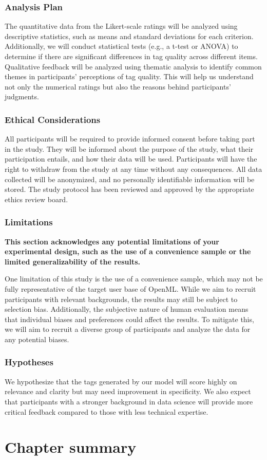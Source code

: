\subsubsection{Analysis Plan}
The quantitative data from the Likert-scale ratings will be analyzed using descriptive statistics, such as means and standard deviations for each criterion. Additionally, we will conduct statistical tests (e.g., a t-test or ANOVA) to determine if there are significant differences in tag quality across different items. Qualitative feedback will be analyzed using thematic analysis to identify common themes in participants' perceptions of tag quality. This will help us understand not only the numerical ratings but also the reasons behind participants' judgments.

\subsubsection{Ethical Considerations}
All participants will be required to provide informed consent before taking part in the study. They will be informed about the purpose of the study, what their participation entails, and how their data will be used. Participants will have the right to withdraw from the study at any time without any consequences. All data collected will be anonymized, and no personally identifiable information will be stored. The study protocol has been reviewed and approved by the appropriate ethics review board.

\subsubsection{Limitations}
\textbf{This section acknowledges any potential limitations of your experimental design, such as the use of a convenience sample or the limited generalizability of the results.}

One limitation of this study is the use of a convenience sample, which may not be fully representative of the target user base of OpenML. While we aim to recruit participants with relevant backgrounds, the results may still be subject to selection bias. Additionally, the subjective nature of human evaluation means that individual biases and preferences could affect the results. To mitigate this, we will aim to recruit a diverse group of participants and analyze the data for any potential biases.

\subsubsection{Hypotheses}
We hypothesize that the tags generated by our model will score highly on relevance and clarity but may need improvement in specificity. We also expect that participants with a stronger background in data science will provide more critical feedback compared to those with less technical expertise.

\section{Chapter summary}